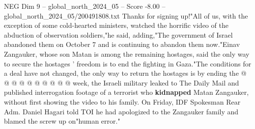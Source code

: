 \begin{textsample}{NEG Dim 9 – global\_north\_2024\_05 – Score -8.00 – global\_north\_2024\_05/200491808.txt}
Thanks for signing up!"All of us, with the exception of some cold-hearted ministers, watched the horrific video of the abduction of observation soldiers,"he said, adding,"The government of Israel abandoned them on October 7 and is continuing to abandon them now."Einav Zangauker, whose son Matan is among the remaining hostages, said the only way to secure the hostages ' freedom is to end the fighting in Gaza."The conditions for a deal have not changed, the only way to return the hostages is by ending the @ @ @ @ @ @ @ @ @ @ week, the Israeli military leaked to The Daily Mail and published interrogation footage of a terrorist who \textbf{kidnapped} Matan Zangauker, without first showing the video to his family.
On Friday, IDF Spokesman Rear Adm.
Daniel Hagari told TOI he had apologized to the Zangauker family and blamed the screw up on"human error."

\end{textsample}
